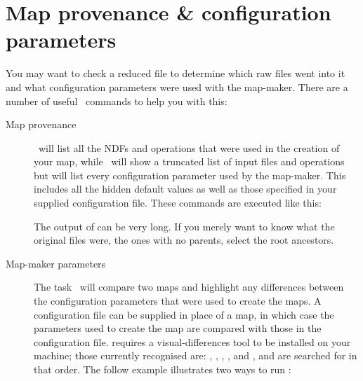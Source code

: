 \section{Map provenance \& configuration parameters}
\label{sec:prov}

You may want to check a reduced file to determine which raw files went
into it and what configuration parameters were used with the
map-maker. There are a number of useful \Kappa\ commands to help you
with this:

\begin{description}
\item[Map provenance]
  \provshow\ will list all the NDFs and operations that were used in the
  creation of your map, while \hislist\ will show a truncated list of input
  files and operations but will list every configuration parameter used by
  the map-maker.  This includes all the hidden default values as well as
  those specified in your supplied configuration file. These commands are
  executed like this:

\begin{terminalv}
\end{terminalv}

The output of  can be very long.  If you merely want to
know what the original files were, the ones with no parents, select the
root ancestors.

\begin{terminalv}
\end{terminalv}


\item[Map-maker parameters]
The task \configmeld\ will compare two maps and highlight any differences
between the configuration parameters that were used to create the maps. A
configuration file can be supplied in place of a map, in which case the
parameters used to create the map are compared with those in the
configuration file.  requires a visual-differences tool
to be installed on your machine; those currently recognised are:
,
,
,
, and
,
and are searched for in that order. The follow example illustrates two
ways to run :


\end{description}
